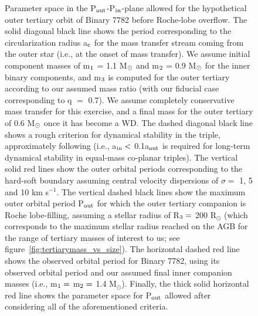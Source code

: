 \documentclass{aastex62}
\begin{document}
\begin{figure}[ht!]
\caption{Parameter space in the P$_{\rm out}$-P$_{\rm in}$-plane
  allowed for the hypothetical outer tertiary orbit of Binary 7782
  before Roche-lobe overflow.  The solid diagonal black line shows the
  period corresponding to the circularization radius a$_{\rm c}$ for
  the mass transfer stream coming from the outer star (i.e., at the
  onset of mass transfer).  
We assume initial
  component masses of m$_{\rm 1}$ = 1.1 M$_{\rm \odot}$ and m$_{\rm
    2}$ = 0.9 M$_{\rm \odot}$ for the inner binary components, and
  m$_{\rm 3}$ is computed for the outer tertiary according to our
  assumed mass ratio (with our fiducial case corresponding to q $=$
  0.7).  We assume completely conservative mass transfer for this
  exercise, and a final mass for the outer tertiary of 0.6 M$_{\rm
    \odot}$ once it has become a WD.  The dashed diagonal black line
  shows a rough criterion for dynamical stability in the triple,
  approximately following \citet{mardling99} (i.e., a$_{\rm in} <$
  0.1a$_{\rm out}$ is required for long-term dynamical stability in
  equal-mass co-planar triples).  The vertical solid red lines show
  the outer orbital periods corresponding to the hard-soft boundary
  assuming central velocity dispersions of $\sigma =$ 1, 5 and 10 km
  s$^{-1}$.  The vertical dashed black lines show the maximum outer
  orbital period P$_{\rm out}$ for which the outer tertiary companion
  is Roche lobe-filling, assuming a stellar radius of R$_{\rm 3} =$
  200 R$_{\odot}$ (which corresponds to the maximum stellar radius
  reached on the AGB for the range of tertiary masses of interest to
  us; see figure~\ref{fig:tertiarymass_vs_size}).  The horizontal dashed red line shows the observed orbital
  period for Binary 7782, using its observed orbital period and our
  assumed final inner companion masses (i.e., m$_{\rm 1} =$ m$_{\rm 2}
  =$ 1.4 M$_{\odot}$).  Finally, the thick solid horizontal red line
  shows the parameter space for P$_{\rm out}$ allowed after
  considering all of the aforementioned criteria.  
\label{fig:fig2}}
\end{figure}
\end{document}
